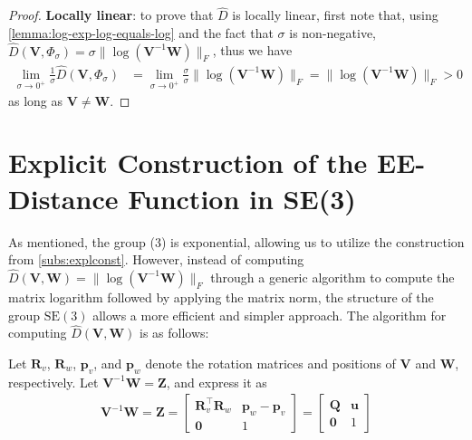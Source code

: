 \begin{proof}
    \textbf{Locally linear}: to prove that $\widehat{D}$ is locally linear, first note that, using \cref{lemma:log-exp-log-equals-log} and the fact that $\sigma$ is non-negative, $\widehat{D}(\mathbf{V}, \Phi_\sigma) = \sigma\|\log{\left(\mathbf{V}^{-1}\mathbf{W}\right)}\|_F$, thus we have
    \begin{align}
            \lim_{\sigma\to0^+}\frac{1}{\sigma}\widehat{D}(\mathbf{V}, \Phi_\sigma) &= \lim_{\sigma\to0^+}\frac{\sigma}{\sigma}\|\log{\left(\mathbf{V}^{-1}\mathbf{W}\right)}\|_F
            = \|\log{\left(\mathbf{V}^{-1}\mathbf{W}\right)}\|_F > 0
    \end{align}
    as long as $\mathbf{V} \not= \mathbf{W}$.
\end{proof}

\section{Explicit Construction of the EE-Distance Function in SE(3)}\label{sec:explicit-construction-SE3}
As mentioned, the group (3) is exponential, allowing us to utilize the construction from \cref{subs:explconst}. However, instead of computing $\widehat{D}(\mathbf{V},\mathbf{W}) = \|\log(\mathbf{V}^{-1}\mathbf{W})\|_F$ through a generic algorithm to compute the matrix logarithm followed by applying the matrix norm, the structure of the group $\text{SE}(3)$ allows a more efficient and simpler approach. The algorithm for computing $\widehat{D}(\mathbf{V},\mathbf{W})$ is as follows:

Let $\mathbf{R}_v$, $\mathbf{R}_w$, $\mathbf{p}_v$, and $\mathbf{p}_w$ denote the rotation matrices and positions of $\mathbf{V}$ and $\mathbf{W}$, respectively. Let $\mathbf{V}^{-1}\mathbf{W} = \mathbf{Z}$, and express it as 
\begin{align*}
    \mathbf{V}^{-1}\mathbf{W} = \mathbf{Z} =\begin{bmatrix}
        \mathbf{R}_v^\top\mathbf{R}_w & \mathbf{p}_w - \mathbf{p}_v \\
        \mathbf{0} & 1
    \end{bmatrix}
    = \begin{bmatrix}
        \mathbf{Q} & \mathbf{u} \\
        \mathbf{0} & 1
    \end{bmatrix}
\end{align*}

